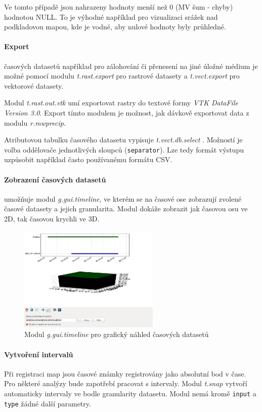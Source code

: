 \documentclass[a4paper,12pt,oneside]{report}
\begin{document}
Ve tomto případě jsou nahrazeny hodnoty menší než 0 (MV šum - chyby)
hodnotou NULL. To je výhodné například pro vizualizaci srážek nad
podkladovou mapou, kde je vodné, aby nulové hodnoty byly průhledné.

\paragraph*{ Export} časových datasetů například pro zálohování či
přenesení na jiné úložné médium je možné pomocí modulu
\textit{t.rast.export} pro rastrové datasety a \textit{t.vect.export}
pro vektorové datasety.

Modul \textit{t.rast.out.vtk} umí exportovat rastry do textové formy
\textit{VTK DataFile Version 3.0}. Export tímto modulem je možnost,
jak dávkově exportovat data z modulu \textit{r.mwprecip}.

Atributovou tabulku časového datasetu vypisuje \textit{
  t.vect.db.select }. Možností je volba oddělovače jednotlivých
sloupců (\texttt{separator}). Lze tedy formát výstupu uzpůsobit
například často používanému formátu CSV.


\paragraph*{Zobrazení časových datasetů } umožňuje modul
\emph{g.gui.timeline}, ve kterém se na časové ose zobrazují zvolené
časové datasety a jejich granularita. Modul dokáže zobrazit jak
časovou osu ve 2D, tak časovou krychli ve 3D.

\begin{figure}[h!]
    \centering
    \includegraphics[width=0.6\textwidth]{./img/temporal/timeline.png}
    \caption[Timeline]{\centering  Modul \textit{g.gui.timeline} pro grafický náhled časových datasetů}
 \end{figure}  




 \paragraph*{Vytvoření intervalů} Při registraci map jsou časové
 známky registrovány jako absolutní bod v čase. Pro některé analýzy
 bude zapotřebí pracovat s intervaly. Modul \textit{t.snap} vytvoří
 automaticky intervaly ve bodle granularity datasetu. Modul nemá kromě
 \texttt{input} a \texttt{type} žádné další parametry.
\end{document}
